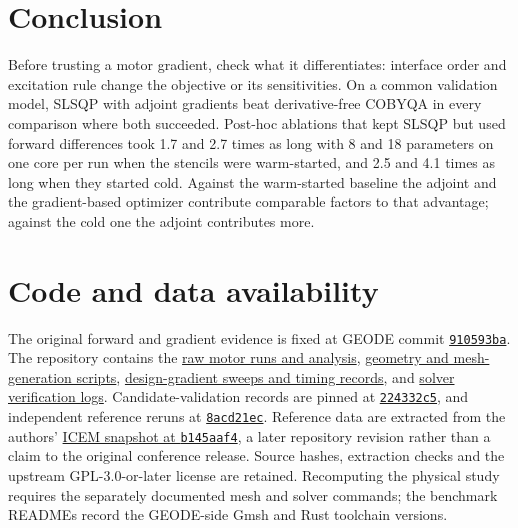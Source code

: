 \documentclass{anvil-paper}
\begin{document}
\section{Conclusion}
Before trusting a motor gradient, check what it differentiates: interface
order and excitation rule change the objective or its sensitivities. On a common validation model, SLSQP with adjoint
gradients beat derivative-free COBYQA in every comparison where both
succeeded. Post-hoc ablations that kept SLSQP but used forward
differences took 1.7 and 2.7 times as long with 8 and 18 parameters on one
core per run when the stencils were warm-started, and 2.5 and 4.1 times as
long when they started cold. Against the warm-started baseline the adjoint
and the gradient-based optimizer contribute comparable factors to that
advantage; against the cold one the adjoint contributes more.

\section*{Code and data availability}
The original forward and gradient evidence is fixed at GEODE commit
\href{https://github.com/rjwalters/geode-fem/tree/910593bad6f64f9f01671c2632b57034e72b9c61}{\texttt{910593ba}}.
The repository contains the
\href{https://github.com/rjwalters/geode-fem/tree/910593bad6f64f9f01671c2632b57034e72b9c61/benchmarks/motor_reference/forward_harmonic}{raw motor runs and analysis},
\href{https://github.com/rjwalters/geode-fem/tree/910593bad6f64f9f01671c2632b57034e72b9c61/benchmarks/motor_reference/geometry}{geometry and mesh-generation scripts},
\href{https://github.com/rjwalters/geode-fem/tree/910593bad6f64f9f01671c2632b57034e72b9c61/benchmarks/motor_shape_gradient/design}{design-gradient sweeps and timing records},
and \href{https://github.com/rjwalters/geode-fem/tree/910593bad6f64f9f01671c2632b57034e72b9c61/benchmarks/motor_nonlinear_m1}{solver verification logs}.
Candidate-validation records are pinned at
\href{https://github.com/rjwalters/geode-fem/tree/224332c526be1191183af82b610973c7778de720/benchmarks/motor_validation}{\texttt{224332c5}},
and independent reference reruns at
\href{https://github.com/rjwalters/geode-fem/tree/8acd21ecf85d89fe077275a3c04ca70b53963d43/benchmarks/motor_reference/reference_refinement}{\texttt{8acd21ec}}.
Reference data are extracted from the authors'
\href{https://github.com/MichaelWiesheu/ICEMsnapshot/tree/b145aaf4ab1a6424828bc941eaf172f48fa0d458}{ICEM snapshot at \texttt{b145aaf4}},
a later repository revision rather than a claim to the original conference
release. Source hashes, extraction checks and the upstream GPL-3.0-or-later license
are retained. Recomputing the physical study requires the separately
documented mesh and solver commands; the benchmark READMEs record the
GEODE-side Gmsh and Rust toolchain versions.
\end{document}
